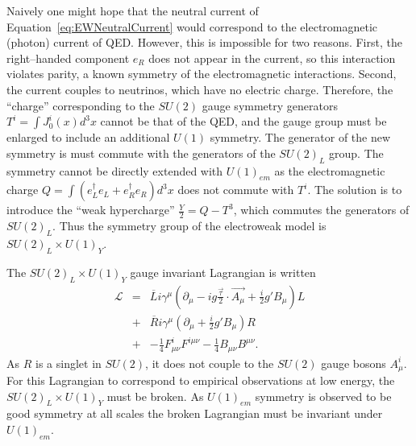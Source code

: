 Naively one might hope that the neutral current of
Equation~\ref{eq:EWNeutralCurrent} would correspond to the electromagnetic
(photon) current of QED\@.  However, this is impossible for two reasons.  First,
the right--handed component $e_R$ does not appear in the current, so this
interaction violates parity, a known symmetry of the electromagnetic
interactions.  Second, the current couples to neutrinos, which have no electric
charge.   Therefore, the ``charge'' corresponding to the $SU(2)$ gauge symmetry
generators $T^i = \int J_0^i(x)d^3x$ cannot be that of the QED\@, and the gauge
group must be enlarged to include an additional $U(1)$ symmetry.  The generator
of the new symmetry is must commute with the generators of the $SU(2)_L$ group.
The symmetry cannot be directly extended with $U(1)_{em}$ as the electromagnetic
charge $Q = \int (e^\dag_L e_L +  e^\dag_R e_R) d^3x$ does not commute with
$T^i$.  The solution is to introduce the ``weak hypercharge'' $\frac{Y}{2} = Q -
T^3$, which commutes the generators of $SU(2)_L$.  Thus the symmetry group of the
electroweak model is $SU(2)_L\times U(1)_Y$.

The $SU(2)_L\times U(1)_Y$ gauge invariant Lagrangian is written 
\begin{eqnarray}
  \mathcal{L} &=& 
  \overline L i \gamma^\mu (\partial_\mu - i g \frac{\vec \tau}{2} \cdot \vec
  {A_\mu} + \frac{i}{2}g'B_\mu)L \nonumber \\
  &+& \overline R i \gamma^\mu (\partial_\mu + \frac{i}{2}g'B_\mu)R \nonumber \\
  &+& -\frac{1}{4}F^i_{\mu\nu} F^{i\mu\nu} -\frac{1}{4}B_{\mu\nu} B^{\mu\nu}.  
  \label{eq:FermionAndGaugeLagrangianGWS}
\end{eqnarray}
As $R$ is a singlet in $SU(2)$, it does not couple to the $SU(2)$ gauge bosons
$A^i_\mu$.  For this Lagrangian to correspond to empirical observations at low
energy, the $SU(2)_L \times U(1)_Y$ must be broken.  As $U(1)_{em}$ symmetry 
is observed to be good symmetry at all scales the broken Lagrangian must
be invariant under $U(1)_{em}$.

